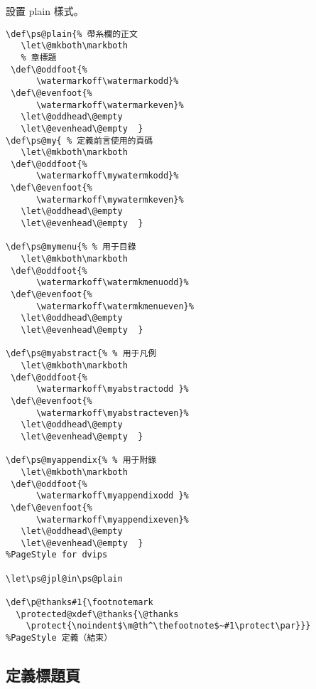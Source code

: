 \par 設置 plain 樣式。
\begin{lstlisting}[firstnumber=749]
%PageStyle 定義（開始）
\def\ps@plain{% 帶糸欄的正文
   \let\@mkboth\markboth
   % 章標題
 \def\@oddfoot{%
      \watermarkoff\watermarkodd}%
 \def\@evenfoot{%
      \watermarkoff\watermarkeven}%
   \let\@oddhead\@empty
   \let\@evenhead\@empty  }
\def\ps@my{ % 定義前言使用的頁碼
   \let\@mkboth\markboth
 \def\@oddfoot{%
      \watermarkoff\mywatermkodd}%
 \def\@evenfoot{%
      \watermarkoff\mywatermkeven}%
   \let\@oddhead\@empty
   \let\@evenhead\@empty  }

\def\ps@mymenu{% % 用于目錄
   \let\@mkboth\markboth
 \def\@oddfoot{%
      \watermarkoff\watermkmenuodd}%
 \def\@evenfoot{%
      \watermarkoff\watermkmenueven}%
   \let\@oddhead\@empty
   \let\@evenhead\@empty  }

\def\ps@myabstract{% % 用于凡例
   \let\@mkboth\markboth
 \def\@oddfoot{%
      \watermarkoff\myabstractodd }%
 \def\@evenfoot{%
      \watermarkoff\myabstracteven}%
   \let\@oddhead\@empty
   \let\@evenhead\@empty  }

\def\ps@myappendix{% % 用于附錄
   \let\@mkboth\markboth
 \def\@oddfoot{%
      \watermarkoff\myappendixodd }%
 \def\@evenfoot{%
      \watermarkoff\myappendixeven}%
   \let\@oddhead\@empty
   \let\@evenhead\@empty  }
%PageStyle for dvips

\let\ps@jpl@in\ps@plain

\def\p@thanks#1{\footnotemark
  \protected@xdef\@thanks{\@thanks
    \protect{\noindent$\m@th^\thefootnote$~#1\protect\par}}}
%PageStyle 定義（結束）
\end{lstlisting}

\subsection{定義標題頁}

